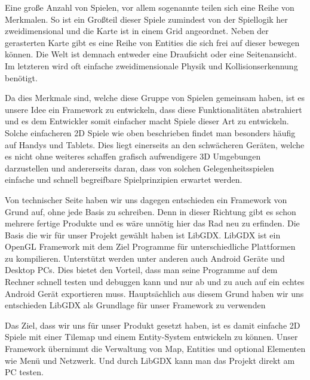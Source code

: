 Eine große Anzahl von Spielen, vor allem sogenannte  teilen sich eine Reihe von Merkmalen.
So ist ein Großteil dieser Spiele zumindest von der Spiellogik her zweidimensional und die Karte ist in einem Grid angeordnet. Neben der gerasterten Karte gibt es eine Reihe von Entities die sich frei auf dieser bewegen können. Die Welt ist demnach entweder eine Draufsicht oder eine Seitenansicht. Im letzteren wird oft einfache zweidimensionale Physik und Kollisionserkennung benötigt.

Da dies Merkmale sind, welche diese Gruppe von Spielen gemeinsam haben, ist es unsere Idee ein Framework zu entwickeln, dass diese Funktionalitäten abstrahiert und es dem Entwickler somit einfacher macht Spiele dieser Art zu entwickeln.
Solche einfacheren 2D Spiele wie oben beschrieben findet man besonders häufig auf Handys und Tablets. Dies liegt einerseits an den schwächeren Geräten, welche es nicht ohne weiteres schaffen grafisch aufwendigere 3D Umgebungen darzustellen und andererseits daran, dass von solchen Gelegenheitsspielen einfache und schnell begreifbare Spielprinzipien erwartet werden.

Von technischer Seite haben wir uns dagegen entschieden ein Framework von Grund auf, ohne jede Basis zu schreiben. Denn in dieser Richtung gibt es schon mehrere fertige Produkte und es wäre unnötig hier das Rad neu zu erfinden. 
Die Basis die wir für unser Projekt gewählt haben ist LibGDX. LibGDX ist ein OpenGL Framework mit dem Ziel Programme für unterschiedliche Plattformen zu kompilieren. Unterstützt werden unter anderen auch Android Geräte und Desktop PCs. Dies bietet den Vorteil, dass man seine Programme auf dem Rechner schnell testen und debuggen kann und nur ab und zu auch auf ein echtes Android Gerät exportieren muss. Hauptsächlich aus diesem Grund haben wir uns entschieden LibGDX als Grundlage für unser Framework zu verwenden

Das Ziel, dass wir uns für unser Produkt gesetzt haben, ist es damit einfache 2D Spiele mit einer Tilemap und einem Entity-System entwickeln zu können. Unser Framework übernimmt die Verwaltung von Map, Entities und optional Elementen wie Menü und Netzwerk. Und durch LibGDX kann man das Projekt direkt am PC testen.